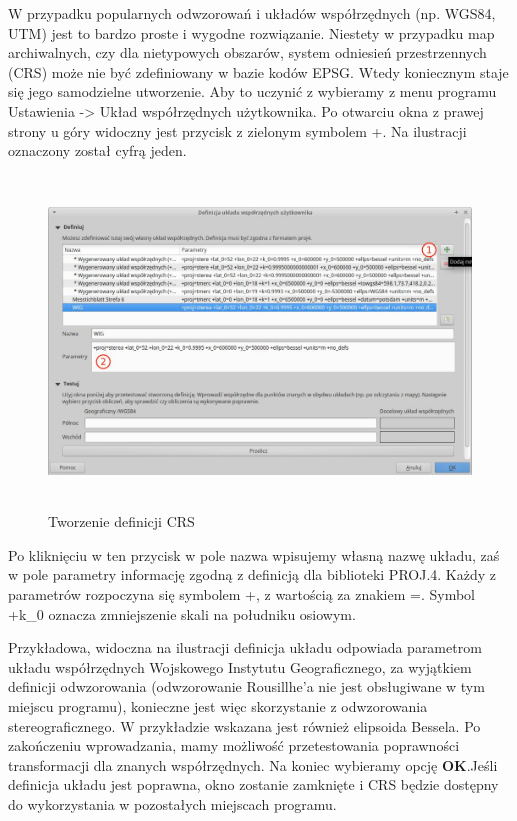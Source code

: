 \documentclass[12pt,a4paper]{book}
\begin{document}
W przypadku popularnych odwzorowań i układów współrzędnych (np. WGS84, UTM) jest to bardzo proste i wygodne rozwiązanie. Niestety w przypadku map archiwalnych, czy dla nietypowych obszarów, system odniesień przestrzennych (CRS) może nie być zdefiniowany w bazie kodów EPSG. Wtedy koniecznym staje się jego samodzielne utworzenie. Aby to uczynić z wybieramy z menu programu Ustawienia -{\textgreater} Układ współrzędnych użytkownika. Po otwarciu okna z prawej strony u góry widoczny jest przycisk z zielonym symbolem +. Na ilustracji oznaczony został cyfrą jeden.



\begin{center}
\begin{figure}
\includegraphics[width=13.998cm,height=8.809cm]{002-crs.jpg}
\caption{Tworzenie definicji CRS}
\end{figure}
\end{center}
Po kliknięciu w ten przycisk w pole nazwa wpisujemy własną nazwę układu, zaś w pole parametry informację zgodną z definicją dla biblioteki PROJ.4. Każdy z parametrów rozpoczyna się symbolem +, z wartością za znakiem =. Symbol +k\_0 oznacza zmniejszenie skali na południku osiowym.

Przykładowa, widoczna na ilustracji definicja układu odpowiada parametrom układu współrzędnych Wojskowego Instytutu Geograficznego, za wyjątkiem definicji odwzorowania (odwzorowanie Rousillhe'a nie jest obsługiwane w tym miejscu programu), konieczne jest więc skorzystanie z odwzorowania stereograficznego. W przykładzie wskazana jest również elipsoida Bessela. Po zakończeniu wprowadzania, mamy możliwość przetestowania poprawności transformacji dla znanych współrzędnych. Na koniec wybieramy opcję \textbf{OK}.Jeśli definicja układu jest poprawna, okno zostanie zamknięte i CRS będzie dostępny do wykorzystania w pozostałych miejscach programu.
\end{document}

